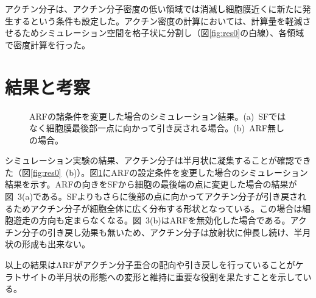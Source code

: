 \documentclass[10pt,twocolumn,a4j]{jarticle}
\begin{document}
アクチン分子は、アクチン分子密度の低い領域では消滅し細胞膜近くに新たに発生するという条件も設定した。アクチン密度の計算においては、計算量を軽減させるためシミュレーション空間を格子状に分割し（図\ref{fig:res0}の白線）、各領域で密度計算を行った。
\section{結果と考察}
\begin{figure}[tbp]
\centering
  \caption{ARFの諸条件を変更した場合のシミュレーション結果。(a)~SFではなく細胞膜最後部一点に向かって引き戻される場合。(b)~ARF無しの場合。}
 \label{fig:res1}
\end{figure}
シミュレーション実験の結果、アクチン分子は半月状に凝集することが確認できた（図\ref{fig:res0}~(b)）。図\ref{fig:res1}にARFの設定条件を変更した場合のシミュレーション結果を示す。ARFの向きをSFから細胞の最後端の点に変更した場合の結果が図~3(a)である。SFよりもさらに後部の点に向かってアクチン分子が引き戻されるためアクチン分子が細胞全体に広く分布する形状となっている。この場合は細胞遊走の方向も定まらなくなる。図~3(b)はARFを無効化した場合である。アクチン分子の引き戻し効果も無いため、アクチン分子は放射状に伸長し続け、半月状の形成も出来ない。

以上の結果はARFがアクチン分子重合の配向や引き戻しを行っていることがケラトサイトの半月状の形態への変形と維持に重要な役割を果たすことを示している。
\end{document}
